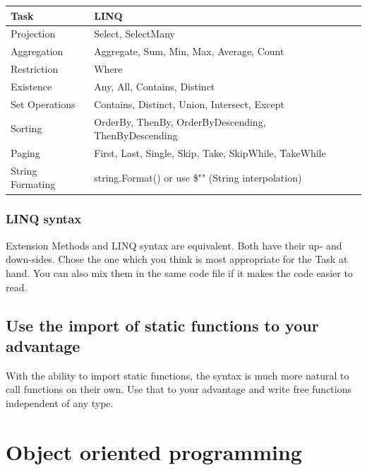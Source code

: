 \documentclass[11pt,a4paper]{article}
\begin{document}
\begin{table}
\centering
\begin{tabular}{lp{60mm}l}
\textbf{Task}        & \textbf{LINQ}                                         \\
\hline
Projection           & Select, SelectMany                                    \\
\hline
Aggregation          & Aggregate, Sum, Min, Max, Average, Count              \\
\hline
Restriction          & Where                                                 \\
\hline
Existence            & Any, All, Contains, Distinct                          \\
\hline
Set Operations       & Contains, Distinct, Union, Intersect, Except          \\
\hline
Sorting              & OrderBy, ThenBy, OrderByDescending, ThenByDescending  \\
\hline
Paging               & First, Last, Single, Skip, Take, SkipWhile, TakeWhile \\
\hline
String Formating     & string.Format() or use \$"" (String interpolation)
\end{tabular}
\end{table}

\subsubsection{LINQ syntax}

Extension Methods and LINQ syntax are equivalent. Both have their up- and down-sides. Chose the one which you think is most appropriate for the Task at hand. You can also mix them in the same code file if it makes the code easier to read.

\subsection{Use the import of static functions to your advantage}

With the ability to import static functions, the syntax is much more natural to call functions on their own. Use that to your advantage and write free functions independent of any type.

\section{Object oriented programming}
\end{document}
